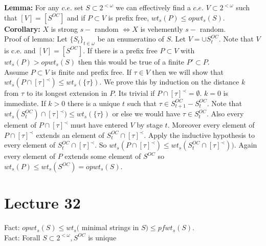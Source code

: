 \documentclass{article}
\begin{document}
  \textbf{Lemma:} For any $c.e.$ set $S \subset 2^{< \omega}$ we can effectively find a $c.e.$ $V \subset 2^{< \omega}$ such that $[V] = [S^{OC}]$ and if $P \subset V$ is prefix free, $wt_s(P) \leq opwt_s(S)$. \\
  \textbf{Corollary:} $X$ is strong $s-$ random $\iff X$ is vehemently $s-$ random. \\
  Proof of lemma: Let $\{S_t\}_{t \in \omega}$ be an enumeratino of $S$. Let $V = \cup S_t^{OC}$. Note that $V$ is c.e. and $[V] = [S^{OC}]$. If there is a prefix free $P \subset V$ with $wt_s(P) > opwt_s(S)$ then this would be true of a finite $P' \subset P$.\\
   Assume $P \subset V$ is finite and prefix free. If $\tau \in V$ then we will show that $wt_s(P \cap [\tau]^\prec) \leq wt_s(\{\tau\})$. We prove this by induction on the distance $k$ from $\tau$ to its longest extension  in $P$. Its trivial if $P \cap [\tau]^\prec = \emptyset$. $k=0$ is immediate. If $k>0$ there is a unique $t$ such that $\tau \in S^{OC}_{t+1} - S_t^{OC}.$ Note that $wt_s(S_t^{OC})\cap [\tau]^\prec )\leq wt_s(\{\tau\})$ or else we would have $\tau \in S_t^{OC}$.  Also every element of $P \cap [\tau]^\prec$ must have entered $V$ by stage $t$. Moreover every element of $P \cap [\tau]^\prec$ extends an element of $S_t^{OC} \cap [\tau]^\prec$. Apply the inductive hypothesis to every element of $S_t^{OC} \cap [\tau]^\prec$. So $wt_s(P \cap [\tau]^\prec) \leq wt_s(S_t^{OC}\cap [\tau]^\prec))$. Again every element of $P$ extends some element of $S^{OC}$ so $wt_s(P) \leq wt_s(S^{OC}) = opwt_s(S)$. 
   \newpage
   \section{Lecture 32}
   Fact: $opwt_s(S) \leq wt_s( $ minimal strings in $S) \leq pfwt_s(S)$.\\
   Fact: Forall $S \subset 2^{<\omega}, S^{OC}$ is unique 
\end{document}
